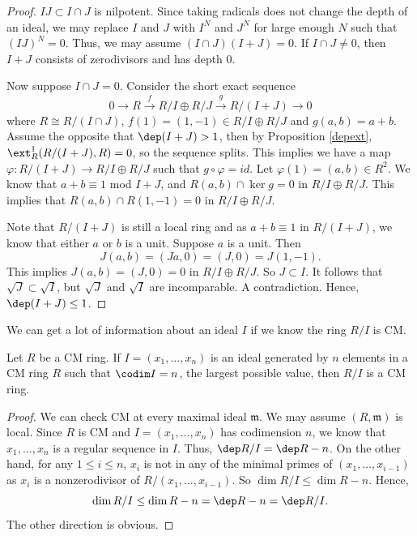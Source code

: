 \begin{proof}
    \(IJ\subset I\cap J\) is nilpotent. Since taking radicals does not change the depth of an ideal, we may replace \(I\) and \(J\) with \(I^N\) and \(J^N\) for large enough \(N\) such that \((IJ)^N=0\). Thus, we may assume \((I\cap J)(I+J)=0\). If \(I\cap J\neq 0\), then \(I+J\) consists of zerodivisors and has depth \(0\). 

    Now suppose \(I\cap J=0\). Consider the short exact sequence
    \[0\rightarrow R\xrightarrow{f} R/I\oplus R/J\xrightarrow{g} R/(I+J)\rightarrow 0\]
    where \(R\cong R/(I\cap J)\), \(f(1)=(1,-1)\in R/I\oplus R/J\) and \(g(a,b)=a+b\). Assume the opposite that \(\dep (I+J)> 1\), then by Proposition \ref{depext}, \(\ext^1_R(R/(I+J),R)=0\), so the sequence splits. This implies we have a map \(\varphi:R/(I+J)\rightarrow R/I\oplus R/J\) such that \(g\circ \varphi=id\). Let \(\varphi(1)=(a,b)\in R^2\). We know that \(a+b\equiv 1\) mod \(I+J\), and \(R(a,b)\cap \ker g=0\) in \(R/I\oplus R/J\). This implies that \(R(a,b)\cap R(1,-1)=0\) in \(R/I\oplus R/J\). 

    Note that \(R/(I+J)\) is still a local ring and as \(a+b\equiv 1\) in \(R/(I+J)\), we know that either \(a\) or \(b\) is a unit. Suppose \(a\) is a unit. Then 
    \[J(a,b)=(Ja,0)=(J,0)=J(1,-1).\]
    This implies \(J(a,b)=(J,0)=0\) in \(R/I\oplus R/J\). So \(J\subset I\). It follows that \(\sqrt{J}\subset \sqrt{I}\), but \(\sqrt{J}\) and \(\sqrt{I}\) are incomparable. A contradiction. Hence, \(\dep (I+J)\leq 1\). 
\end{proof}

We can get a lot of information about an ideal \(I\) if we know the ring \(R/I\) is CM.

\begin{proposition}
     Let \(R\) be a CM ring. If \(I=(x_1,\ldots,x_n)\) is an ideal generated by \(n\) elements in a CM ring \(R\) such that \(\codim I=n\), the largest possible value, then \(R/I\) is a CM ring. 
\end{proposition}

\begin{proof}
    We can check CM at every maximal ideal \(\mathfrak{m}\). We may assume \((R,\mathfrak{m})\) is local. Since \(R\) is CM and \(I=(x_1,\ldots,x_n)\) has codimension \(n\), we know that \(x_1,\ldots,x_n\) is a regular sequence in \(I\). Thus, \(\dep R/I=\dep R-n\). On the other hand, for any \(1\leq i\leq n\), \(x_i\) is not in any of the minimal primes of \((x_1,\ldots,x_{i-1})\) as \(x_i\) is a nonzerodivisor of \(R/(x_1,\ldots,x_{i-1})\). So \(\dim R/I\leq \dim R-n\). Hence, 
    \[\dim R/I\leq \dim R-n=\dep R-n=\dep R/I.\]
    The other direction is obvious. 
\end{proof}

